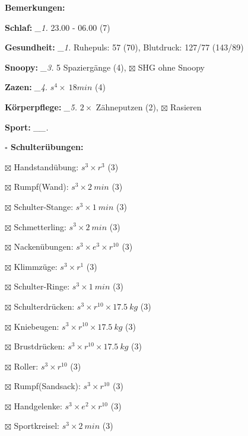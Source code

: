 \documentclass[10pt,a4paper]{article}
\newcommand\prop[1] {{\color {alizarin} {\bf #1}}}             %
\newcommand\mand[1] {{\color {burntorange} {\bf #1}}}          %
\newcommand\topspace{\vskip -15pt \hskip 20pt}
\newcommand\n[1] { {\sl #1.} \hskip 5pt }
\begin{document}
\begin{mdframed}[style=daystyle]
  \begin{labeling}{{\mand {Bemerkungen:}}}
    \setlength\itemsep{-3pt}
  \item[{\mand {Schlaf:}}]        \n{\_1} 23.00 - 06.00 (7)
  \item[{\mand {Gesundheit:}}]    \n{\_1} Ruhepuls: 57 (70), Blutdruck: 127/77 (143/89)
  \item[{\mand {Snoopy:}}]        \n{\_3} 5 Spaziergänge (4), $\boxtimes$ SHG ohne Snoopy  
  \item[{\mand {Zazen:}}]         \n{\_4} $s^4 \times\ 18 min$ (4)
  \item[{\mand {Körperpflege:}}]  \n{\_5} $2 \times$ Zähneputzen (2), $\boxtimes$ Rasieren
  \item[{\mand {Sport:}}]        \n{\_\_}
    \topspace
    \begin{minipage}{0.75\textwidth}  
      \begin{labeling}{\prop {$\square$ {Schulterübungen:}}} 
        \setlength\itemsep{-3pt}
      \item[$\boxtimes$ Handstandübung:]  $s^3 \times r^{3}$ (3)
      \item[$\boxtimes$ Rumpf(Wand):]     $s^3 \times 2\ min$ (3)
      \item[$\boxtimes$ Schulter-Stange:] $s^3 \times 1\ min$ (3)
      \item[$\boxtimes$ Schmetterling:]   $s^3 \times 2\ min$ (3)
      \item[$\boxtimes$ Nackenübungen:]   $s^3 \times e^3 \times r^{10}$ (3)
      \item[$\boxtimes$ Klimmzüge:]       $s^3 \times r^1$ (3)
      \item[$\boxtimes$ Schulter-Ringe:]  $s^3 \times 1\ min$ (3)
      \item[$\boxtimes$ Schulterdrücken:] $s^3 \times r^{10} \times 17.5\ kg$ (3)
      \item[$\boxtimes$ Kniebeugen:]      $s^3 \times r^{10} \times 17.5\ kg$ (3)
      \item[$\boxtimes$ Brustdrücken:]    $s^3 \times r^{10} \times 17.5\ kg$ (3)
      \item[$\boxtimes$ Roller:]          $s^3 \times r^{10}$ (3)
      \item[$\boxtimes$ Rumpf(Sandsack):] $s^3 \times r^{10}$ (3)
      \item[$\boxtimes$ Handgelenke:]     $s^3 \times e^2 \times r^{10}$ (3)
      \item[$\boxtimes$ Sportkreisel:]    $s^3 \times 2\ min$ (3)

\end{labeling}
\end{minipage}
\end{labeling}
\end{mdframed}
\end{document}
